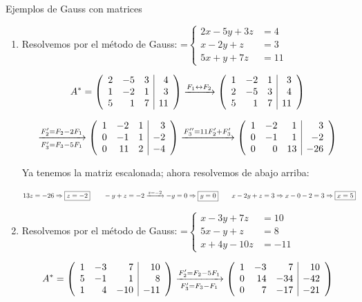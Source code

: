 \documentclass[11pt,a4paper]{article}
\newcommand{\fmm}[1]{\setbox0=\hbox{$#1$}\ifdim\wd0>\linewidth\fmdisp{#1}\else\mbox{\box0}\fi}
\newcommand{\fmdisp}[1]{\[\setbox2=\hbox{$\displaystyle #1$}\ifdim\wd2>\linewidth\resizebox{\linewidth}{!}{\box2}\else\box2\fi\]}
\begin{document}
\begin{fmex}{Ejemplos de Gauss con matrices}
\begin{enumerate}[label=\textbf{\arabic*.},leftmargin=*]
\item Resolvemos por el método de Gauss: \fmm{\left\{\begin{aligned}2x-5y+3z&=4\\ x-2y+z&=3\\ 5x+y+7z&=11\end{aligned}\right.}

\fmdisp{A^*=\left(\begin{array}{rrr|r}2 & -5 & 3 & 4\\ 1 & -2 & 1 & 3\\ 5 & 1 & 7 & 11\end{array}\right)\xrightarrow{F_1\leftrightarrow F_2}\left(\begin{array}{rrr|r}1 & -2 & 1 & 3\\ 2 & -5 & 3 & 4\\ 5 & 1 & 7 & 11\end{array}\right)}

\fmdisp{\xrightarrow[F_3'=F_3-5F_1]{F_2'=F_2-2F_1}\left(\begin{array}{rrr|r}1 & -2 & 1 & 3\\ 0 & -1 & 1 & -2\\ 0 & 11 & 2 & -4\end{array}\right)\xrightarrow{F_3''=11F_2'+F_3'}\left(\begin{array}{rrr|r}1 & -2 & 1 & 3\\ 0 & -1 & 1 & -2\\ 0 & 0 & 13 & -26\end{array}\right)}

Ya tenemos la matriz escalonada; ahora resolvemos de abajo arriba:

\fmdisp{13z=-26\Rightarrow\boxed{z=-2}\qquad -y+z=-2\xrightarrow{z=-2}-y=0\Rightarrow\boxed{y=0}\qquad x-2y+z=3\Rightarrow x-0-2=3\Rightarrow\boxed{x=5}}

\item Resolvemos por el método de Gauss: \fmm{\left\{\begin{aligned}x-3y+7z&=10\\ 5x-y+z&=8\\ x+4y-10z&=-11\end{aligned}\right.}

\fmdisp{A^*=\left(\begin{array}{rrr|r}1 & -3 & 7 & 10\\ 5 & -1 & 1 & 8\\ 1 & 4 & -10 & -11\end{array}\right)\xrightarrow[F_3'=F_3-F_1]{F_2'=F_2-5F_1}\left(\begin{array}{rrr|r}1 & -3 & 7 & 10\\ 0 & 14 & -34 & -42\\ 0 & 7 & -17 & -21\end{array}\right)}


\end{enumerate}
\end{fmex}
\end{document}
